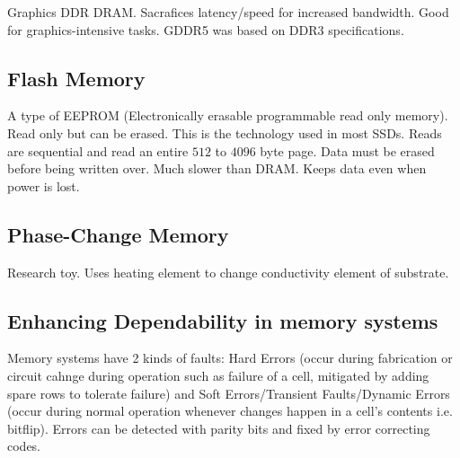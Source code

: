 \documentclass{article}
\begin{document}
Graphics DDR DRAM. Sacrafices latency/speed for increased bandwidth. Good for graphics-intensive tasks. GDDR5 was based on DDR3 specifications.

\subsection{Flash Memory}

A type of EEPROM (Electronically erasable programmable read only memory). Read only but can be erased. This is the technology used in most SSDs. Reads are sequential and read an entire $512$ to $4096$ byte page. Data must be erased before being written over. Much slower than DRAM. Keeps data even when power is lost.

\subsection{Phase-Change Memory}

Research toy. Uses heating element to change conductivity element of substrate. 

\subsection{Enhancing Dependability in memory systems}

Memory systems have 2 kinds of faults: Hard Errors (occur during fabrication or circuit cahnge during operation such as failure of a cell, mitigated by adding spare rows to tolerate failure) and Soft Errors/Transient Faults/Dynamic Errors (occur during normal operation whenever changes happen in a cell's contents i.e. bitflip). Errors can be detected with parity bits and fixed by error correcting codes. 
\end{document}
